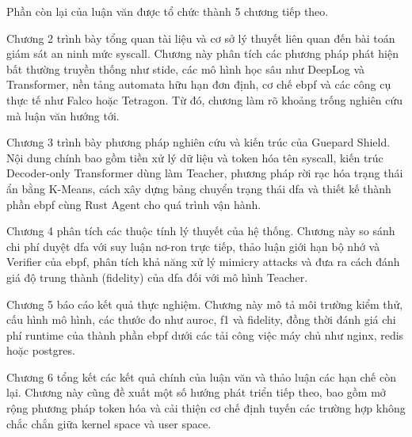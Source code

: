 \documentclass[../main.tex]{subfiles}
\begin{document}
Phần còn lại của luận văn được tổ chức thành 5 chương tiếp theo.

Chương 2 trình bày tổng quan tài liệu và cơ sở lý thuyết liên quan
đến bài toán giám sát an ninh mức \gls{syscall}. Chương này phân tích các
phương pháp phát hiện bất thường truyền thống như \gls{stide}, các mô hình
học sâu như DeepLog và Transformer, nền tảng automata hữu hạn đơn
định, cơ chế \gls{ebpf} và các công cụ thực tế như Falco hoặc Tetragon. Từ
đó, chương làm rõ khoảng trống nghiên cứu mà luận văn hướng tới.

Chương 3 trình bày phương pháp nghiên cứu và kiến trúc của Guepard
Shield. Nội dung chính bao gồm tiền xử lý dữ liệu và token hóa tên
\gls{syscall}, kiến trúc Decoder-only Transformer dùng làm Teacher, phương
pháp rời rạc hóa trạng thái ẩn bằng K-Means, cách xây dựng bảng
chuyển trạng thái \gls{dfa} và thiết kế thành phần \gls{ebpf} cùng Rust Agent cho
quá trình vận hành.

Chương 4 phân tích các thuộc tính lý thuyết của hệ thống. Chương này
so sánh chi phí duyệt \gls{dfa} với suy luận nơ-ron trực tiếp, thảo luận
giới hạn bộ nhớ và Verifier của \gls{ebpf}, phân tích khả năng xử lý
mimicry attacks và đưa ra cách đánh giá độ trung thành (fidelity) của
\gls{dfa} đối với mô hình Teacher.

Chương 5 báo cáo kết quả thực nghiệm. Chương này mô tả môi trường
kiểm thử, cấu hình mô hình, các thước đo như \gls{auroc}, \gls{f1} và fidelity,
đồng thời đánh giá chi phí runtime của thành phần \gls{ebpf} dưới các tải
công việc máy chủ như nginx, redis hoặc postgres.

Chương 6 tổng kết các kết quả chính của luận văn và thảo luận các
hạn chế còn lại. Chương này cũng đề xuất một số hướng phát triển tiếp
theo, bao gồm mở rộng phương pháp token hóa và cải thiện cơ chế định
tuyến các trường hợp không chắc chắn giữa kernel space và user space.
\end{document}

